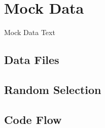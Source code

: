\section{Mock Data}
\label{sect:mock-data}
Mock Data Text
\subsection{Data Files}

\subsection{Random Selection}

\subsection{Code Flow}